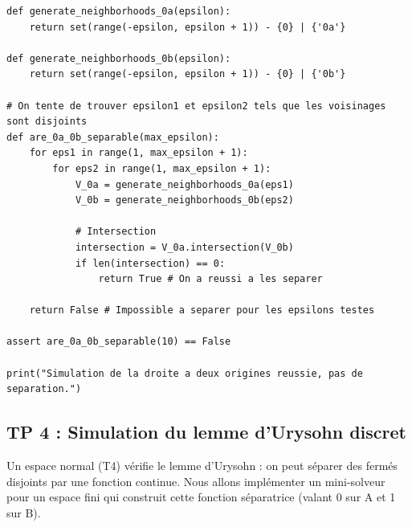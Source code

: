 \documentclass[11pt,a4paper]{article}
\begin{document}
\begin{lstlisting}
def generate_neighborhoods_0a(epsilon):
    return set(range(-epsilon, epsilon + 1)) - {0} | {'0a'}

def generate_neighborhoods_0b(epsilon):
    return set(range(-epsilon, epsilon + 1)) - {0} | {'0b'}

# On tente de trouver epsilon1 et epsilon2 tels que les voisinages sont disjoints
def are_0a_0b_separable(max_epsilon):
    for eps1 in range(1, max_epsilon + 1):
        for eps2 in range(1, max_epsilon + 1):
            V_0a = generate_neighborhoods_0a(eps1)
            V_0b = generate_neighborhoods_0b(eps2)

            # Intersection
            intersection = V_0a.intersection(V_0b)
            if len(intersection) == 0:
                return True # On a reussi a les separer

    return False # Impossible a separer pour les epsilons testes

assert are_0a_0b_separable(10) == False

print("Simulation de la droite a deux origines reussie, pas de separation.")
\end{lstlisting}





\subsection{TP 4 : Simulation du lemme d'Urysohn discret}


Un espace normal (T4) vérifie le lemme d'Urysohn : on peut séparer des fermés disjoints par une fonction continue.
Nous allons implémenter un mini-solveur pour un espace fini qui construit cette fonction séparatrice (valant 0 sur A et 1 sur B).
\end{document}

